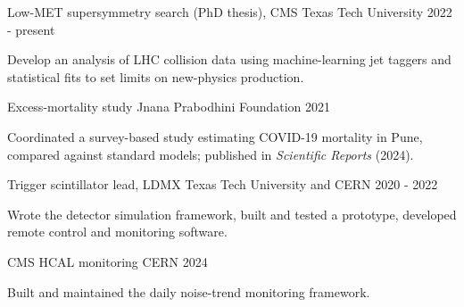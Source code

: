 \begin{cventries}
  \cventry
    {Low-MET supersymmetry search (PhD thesis), CMS} %
    {Texas Tech University} %
    {} %
    {2022 - present} %
    {
      \begin{cvitems}
      \item {Develop an analysis of LHC collision data using machine-learning jet taggers and statistical fits to set limits on new-physics production.}
      \end{cvitems}
    }
  \cventry
    {Excess-mortality study} %
    {Jnana Prabodhini Foundation} %
    {} %
    {2021} %
    {
      \begin{cvitems}
      \item {Coordinated a survey-based study estimating COVID-19 mortality in Pune, compared against standard models; published in \textit{Scientific Reports} (2024).}
      \end{cvitems}
    }
  \cventry
    {Trigger scintillator lead, LDMX} %
    {Texas Tech University and CERN} %
    {} %
    {2020 - 2022} %
    {
      \begin{cvitems}
      \item {Wrote the detector simulation framework, built and tested a prototype, developed remote control and monitoring software.}
      \end{cvitems}
    }
  \cventry
    {CMS HCAL monitoring} %
    {CERN} %
    {} %
    {2024} %
    {
      \begin{cvitems}
      \item {Built and maintained the daily noise-trend monitoring framework.}
      \end{cvitems}
    }
\end{cventries}

